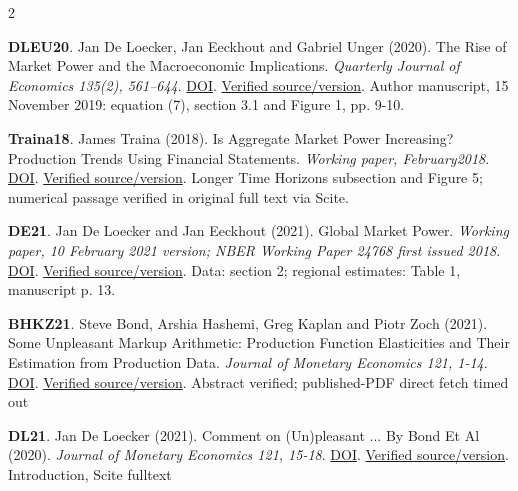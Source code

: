 \documentclass[10pt,a4paper,landscape]{article}
\begin{document}
\begin{multicols}{2}
\begin{minipage}{\linewidth}\hypertarget{ref:DLEU20}{}\textbf{DLEU20}. Jan De Loecker, Jan Eeckhout and Gabriel Unger (2020). The Rise of Market Power and the Macroeconomic Implications. \emph{Quarterly Journal of Economics 135(2), 561--644}. \href{https://doi.org/10.1093/qje/qjz041}{DOI}. \href{https://www.janeeckhout.com/wp-content/uploads/RMP.pdf}{Verified source/version}. Author manuscript, 15 November 2019: equation (7), section 3.1 and Figure 1, pp. 9-10.\end{minipage}\par
\begin{minipage}{\linewidth}\hypertarget{ref:Traina18}{}\textbf{Traina18}. James Traina (2018). Is Aggregate Market Power Increasing? Production Trends Using Financial Statements. \emph{Working paper, February2018}. \href{https://doi.org/10.2139/ssrn.3120849}{DOI}. \href{https://doi.org/10.2139/ssrn.3120849}{Verified source/version}. Longer Time Horizons subsection and Figure 5; numerical passage verified in original full text via Scite.\end{minipage}\par
\begin{minipage}{\linewidth}\hypertarget{ref:DE21}{}\textbf{DE21}. Jan De Loecker and Jan Eeckhout (2021). Global Market Power. \emph{Working paper, 10 February 2021 version; NBER Working Paper 24768 first issued 2018}. \href{https://doi.org/10.3386/w24768}{DOI}. \href{https://crei.cat/wp-content/uploads/2021/04/GLOBAL.pdf}{Verified source/version}. Data: section 2; regional estimates: Table 1, manuscript p. 13.\end{minipage}\par
\begin{minipage}{\linewidth}\hypertarget{ref:BHKZ21}{}\textbf{BHKZ21}. Steve Bond, Arshia Hashemi, Greg Kaplan and Piotr Zoch (2021). Some Unpleasant Markup Arithmetic: Production Function Elasticities and Their Estimation from Production Data. \emph{Journal of Monetary Economics 121, 1-14}. \href{https://doi.org/10.1016/j.jmoneco.2021.05.004}{DOI}. \href{https://arshiahashemi.com/publication/jme-2021-bhkz/JME-2021-BHKZ.pdf}{Verified source/version}. Abstract verified; published-PDF direct fetch timed out\end{minipage}\par
\begin{minipage}{\linewidth}\hypertarget{ref:DL21}{}\textbf{DL21}. Jan De Loecker (2021). Comment on (Un)pleasant ... By Bond Et Al (2020). \emph{Journal of Monetary Economics 121, 15-18}. \href{https://doi.org/10.1016/j.jmoneco.2021.04.009}{DOI}. \href{https://doi.org/10.1016/j.jmoneco.2021.04.009}{Verified source/version}. Introduction, Scite fulltext\end{minipage}\par

\end{multicols}
\end{document}

